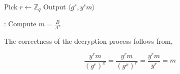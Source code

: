 \begin{algorithmic}
\STATE Pick $ r \leftarrow \mathbb{Z}_q $ 
\STATE Output $ \langle g^r, y^r m \rangle $ 
\end{algorithmic}

\begin{algorithmic}
:
\STATE Compute $ m = \frac{B}{A^x} $ 
\end{algorithmic}

The correctness of the decryption process follows from,

\begin{equation*}
\frac{y^r m}{(g^r)^x} = \frac{y^r m}{(g^x)^r} = \frac{y^r m }{y^r} = m
\end{equation*}
